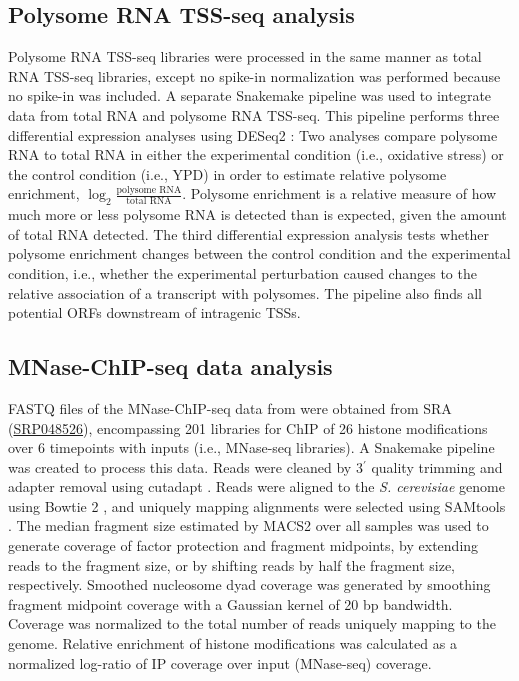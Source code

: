\subsection{Polysome RNA TSS-seq analysis}

Polysome RNA TSS-seq libraries were processed in the same manner as total RNA TSS-seq libraries, except no spike-in normalization was performed because no spike-in was included.
A separate Snakemake pipeline was used to integrate data from total RNA and polysome RNA TSS-seq.
This pipeline performs three differential expression analyses using DESeq2 \citep{love2014}: Two analyses compare polysome RNA to total RNA in either the experimental condition (i.e., oxidative stress) or the control condition (i.e., YPD) in order to estimate relative polysome enrichment, $\log_2 \frac{\text{polysome RNA}}{\text{total RNA}}$.
Polysome enrichment is a relative measure of how much more or less polysome RNA is detected than is expected, given the amount of total RNA detected.
The third differential expression analysis tests whether polysome enrichment changes between the control condition and the experimental condition, i.e., whether the experimental perturbation caused changes to the relative association of a transcript with polysomes.
The pipeline also finds all potential ORFs downstream of intragenic TSSs.

\subsection{MNase-ChIP-seq data analysis}

FASTQ files of the MNase-ChIP-seq data from \citet{weiner2015} were obtained from SRA (\href{https://www.ncbi.nlm.nih.gov/sra?term=SRP048526}{SRP048526}), encompassing 201 libraries for ChIP of 26 histone modifications over 6 timepoints with inputs (i.e., MNase-seq libraries).
A Snakemake pipeline was created to process this data.
Reads were cleaned by 3$^\prime$ quality trimming and adapter removal using cutadapt \citep{martin2011}.
Reads were aligned to the \textit{S. cerevisiae} genome using Bowtie 2 \citep{langmead2012}, and uniquely mapping alignments were selected using SAMtools \citep{li2009}.
The median fragment size estimated by MACS2 \citep{zhang2008} over all samples was used to generate coverage of factor protection and fragment midpoints, by extending reads to the fragment size, or by shifting reads by half the fragment size, respectively.
Smoothed nucleosome dyad coverage was generated by smoothing fragment midpoint coverage with a Gaussian kernel of 20 bp bandwidth.
Coverage was normalized to the total number of reads uniquely mapping to the genome.
Relative enrichment of histone modifications was calculated as a normalized log-ratio of IP coverage over input (MNase-seq) coverage.

